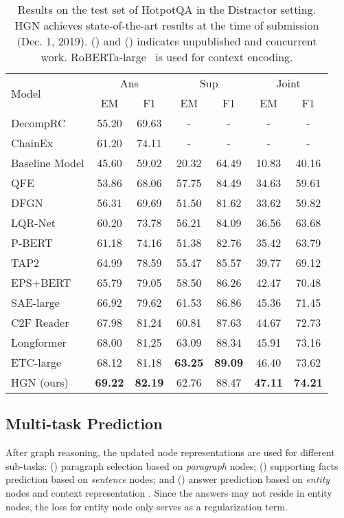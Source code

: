 \documentclass[11pt,a4paper]{article}
\begin{document}
\begin{table*}[t!]
\centering
\begin{adjustbox}{scale=0.95,center}
\begin{tabular}{lcccccc}
\toprule
\multirow{2}{*}{Model} & \multicolumn{2}{c}{Ans} & \multicolumn{2}{c}{Sup}  &  \multicolumn{2}{c}{Joint} \\ & EM & F1 & EM & F1 & EM & F1 \\ \midrule
DecompRC \cite{min2019multi} & 55.20 & 69.63 & - & - & - & - \\ 
ChainEx \cite{chen2019multi} & 61.20	& 74.11 & - & - & - & - \\
Baseline Model \cite{yang2018hotpotqa} & 45.60 & 59.02 & 20.32 & 64.49 & 10.83 & 40.16 \\
QFE \cite{nishida2019answering} & 53.86 & 68.06 & 57.75 & 84.49 & 34.63 & 59.61 \\
DFGN \cite{DFGN} & 56.31 & 69.69 & 51.50 & 81.62 & 33.62 & 59.82 \\
LQR-Net \cite{grail2020latent} & 60.20 & 73.78 & 56.21 & 84.09 & 36.56 & 63.68 \\
P-BERT & 61.18 & 74.16 & 51.38 & 82.76 & 35.42 & 63.79 \\
TAP2~\cite{glass2019span} & 64.99 & 78.59 & 55.47 & 85.57 & 39.77 & 69.12 \\
EPS+BERT & 65.79 & 79.05 & 58.50 & 86.26 & 42.47 & 70.48 \\
SAE-large \cite{tu2019select} & 66.92 & 79.62 & 61.53 & 86.86 & 45.36 & 71.45 \\
C2F Reader\cite{c2f} & 67.98 & 81.24 & 60.81 & 87.63 & 44.67 & 72.73 \\
Longformer~\cite{Beltagy2020Longformer} & 68.00 & 81.25 & 63.09 & 88.34 & 45.91 & 73.16 \\
ETC-large~\cite{zaheer2020big} & 68.12 & 81.18 & \textbf{63.25} & \textbf{89.09} &  46.40 & 73.62 \\
\midrule
HGN (ours) & \textbf{69.22} & \textbf{82.19} & 62.76 & 88.47 & \textbf{47.11} & \textbf{74.21} \\ \bottomrule
\end{tabular}
\end{adjustbox}
\caption{\label{tab:leaderboard_distractor}
Results on the test set of HotpotQA in the Distractor setting. HGN achieves state-of-the-art results at the time of submission (Dec. 1, 2019). () and () indicates unpublished and concurrent work. RoBERTa-large~\cite{liu2019roberta} is used for context encoding.}
\end{table*} 
\subsection{Multi-task Prediction} \label{sec:prediction}
After graph reasoning, the updated node representations are used for different sub-tasks: () paragraph selection based on \emph{paragraph} nodes; () supporting facts prediction based on \emph{sentence} nodes; and () answer prediction based on \emph{entity} nodes and context representation . Since the answers may not reside in entity nodes, the loss for entity node only serves as a regularization term.
\end{document}
